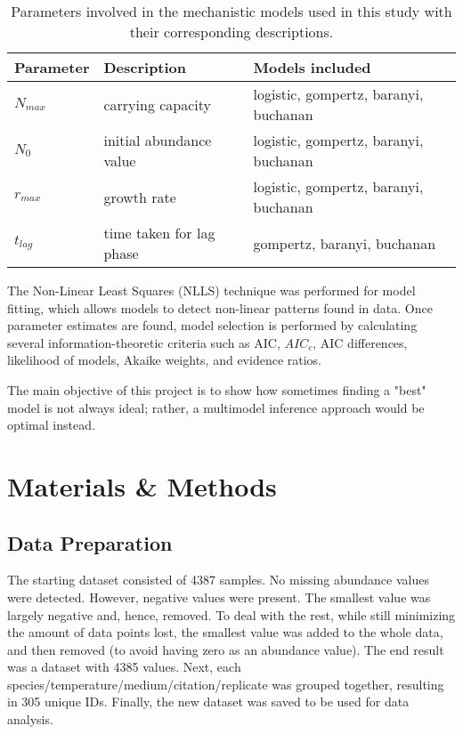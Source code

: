 \documentclass[11pt]{article}
\begin{document}
\begin{linenumbers}
	\begin{table}[ht]
		\centering
		\begin{tabular}{|l|l|l|}
			\hline
			Parameter & Description              & Models included                       \\ \hline\hline
			$N_{max}$ & carrying capacity        & logistic, gompertz, baranyi, buchanan \\ \hline
			$N_0$     & initial abundance value  & logistic, gompertz, baranyi, buchanan \\ \hline
			$r_{max}$ & growth rate              & logistic, gompertz, baranyi, buchanan \\ \hline
			$t_{lag}$ & time taken for lag phase & gompertz, baranyi, buchanan           \\ \hline
		\end{tabular}
		\caption{Parameters involved in the mechanistic models used in this study with their corresponding descriptions.}
		\label{tab:parameters}
	\end{table}

	\par The Non-Linear Least Squares (NLLS) technique was performed for model fitting, which allows models to detect non-linear patterns found in data. Once parameter estimates are found, model selection is performed by calculating several information-theoretic criteria such as AIC, $AIC_c$, AIC differences, likelihood of models, Akaike weights, and evidence ratios.
	\par The main objective of this project is to show how sometimes finding a "best" model is not always ideal; rather, a multimodel inference approach would be optimal instead.

	\section{Materials \& Methods}
	\subsection{Data Preparation}
	The starting dataset consisted of 4387 samples. No missing abundance values were detected. However, negative values were present. The smallest value was largely negative and, hence, removed. To deal with the rest, while still minimizing the amount of data points lost, the smallest value was added to the whole data, and then removed (to avoid having zero as an abundance value). The end result was a dataset with 4385 values.
	Next, each species/temperature/medium/citation/replicate was grouped together, resulting in 305 unique IDs. Finally, the new dataset was saved to be used for data analysis.


\end{linenumbers}
\end{document}
